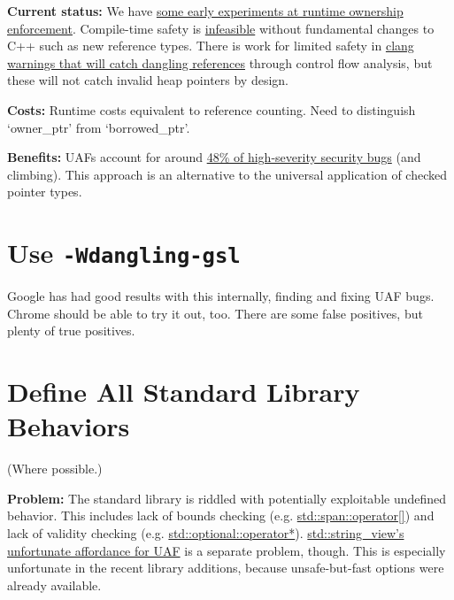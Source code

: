 \documentclass[a4paper,12pt,notitlepage,twoside,openright]{article}
\begin{document}
\textbf{Current status:} We
have \href{https://www.google.com/url?q=https://docs.google.com/document/d/1YnJBXshxxpUkgzgEsuGTvxsFqVq_YFzsueQHxpbDZJU/edit\&sa=D\&source=editors\&ust=1631944129047000\&usg=AOvVaw2B9xqIF8Z6_YCzRSAf9YY1}{some
early experiments at runtime ownership enforcement}. Compile-time
safety
is \href{https://www.google.com/url?q=https://docs.google.com/document/d/1oVTxJ-4VItkcA7rAMylIW74SOmKsnc4aS6bylr1B8ZY/edit?usp\%3Dsharing\%26resourcekey\%3D0-RNrtKRt8CQ_BgGdGzrDwUA\&sa=D\&source=editors\&ust=1631944129047000\&usg=AOvVaw2FvCsUz7Sn-st7JCiyuSzw}{infeasible} without
fundamental changes to C++ such as new reference types. There is work
for limited safety
in \href{https://www.google.com/url?q=https://youtu.be/80BZxujhY38?t\%3D1096\&sa=D\&source=editors\&ust=1631944129047000\&usg=AOvVaw3izQ8dqJsUTUsFa7E7ou28}{clang
warnings that will catch dangling references} through control flow
analysis, but these will not catch invalid heap pointers by design.

\textbf{Costs:} Runtime costs equivalent to reference counting. Need to
distinguish `owner\_ptr' from `borrowed\_ptr'.

\textbf{Benefits:} UAFs account for
around \href{https://docs.google.com/document/d/e/2PACX-1vRZr-HJcYmf2Y76DhewaiJOhRNpjGHCxliAQTBhFxzv1QTae9o8mhBmDl32CRIuaWZLt5kVeH9e9jXv/pub\#h.eoikp3r0cwlf}{48\%
of high-severity security bugs} (and climbing). This approach is an
alternative to the universal application of checked pointer types.

\section{Use \texttt{-Wdangling-gsl}}

Google has had good results with this internally, finding and fixing UAF
bugs. Chrome should be able to try it out, too. There are some false
positives, but plenty of true positives.

\section{Define All Standard Library Behaviors}

(Where possible.)

\textbf{Problem:} The standard library is riddled with potentially
exploitable undefined behavior. This includes lack of bounds checking
(e.g. \href{https://www.google.com/url?q=https://en.cppreference.com/w/cpp/container/span/operator_at\&sa=D\&source=editors\&ust=1631944129049000\&usg=AOvVaw0ppTtrO7NVxYBnq9-OMQdg}{std::span::operator{[}{]}})
and lack of validity checking
(e.g. \href{https://www.google.com/url?q=https://en.cppreference.com/w/cpp/utility/optional/operator*\&sa=D\&source=editors\&ust=1631944129049000\&usg=AOvVaw23V3p_TRgf2pMCe7iZc9tZ}{std::optional::operator*}). \href{https://www.google.com/url?q=https://github.com/isocpp/CppCoreGuidelines/issues/1038\&sa=D\&source=editors\&ust=1631944129050000\&usg=AOvVaw3BLCBEKIo0Kyb9KcOajrgL}{std::string\_view's
unfortunate affordance for UAF} is a separate problem, though. This is
especially unfortunate in the recent library additions, because
unsafe-but-fast options were already available.
\end{document}
